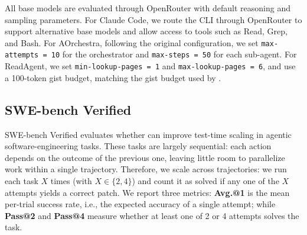All base models are evaluated through OpenRouter with default reasoning and sampling parameters. For Claude Code, we route the CLI through OpenRouter to support alternative base models and allow access to tools such as Read, Grep, and Bash. For AOrchestra, following the original configuration, we set \texttt{max-attempts = 10} for the orchestrator and \texttt{max-steps = 50} for each sub-agent. For ReadAgent, we set \texttt{min-lookup-pages = 1} and \texttt{max-lookup-pages = 6}, and use a 100-token gist budget, matching the gist budget used by \toolName{}.

\subsection{SWE-bench Verified}
\label{sec:swe}
SWE-bench Verified evaluates whether \toolName{} can improve test-time scaling in agentic software-engineering tasks. These tasks are largely sequential: each action depends on the outcome of the previous one, leaving little room to parallelize work {within} a single trajectory. Therefore, we scale {across} trajectories: we run each task $X$ times (with $X\in\{2,4\}$) and count it as solved if any one of the $X$ attempts yields a correct patch. We report three metrics: \textbf{Avg.@1} is the mean per-trial success rate, i.e., the expected accuracy of a single attempt; while \textbf{Pass@2} and \textbf{Pass@4} measure whether at least one of 2 or 4 attempts solves the task. 

